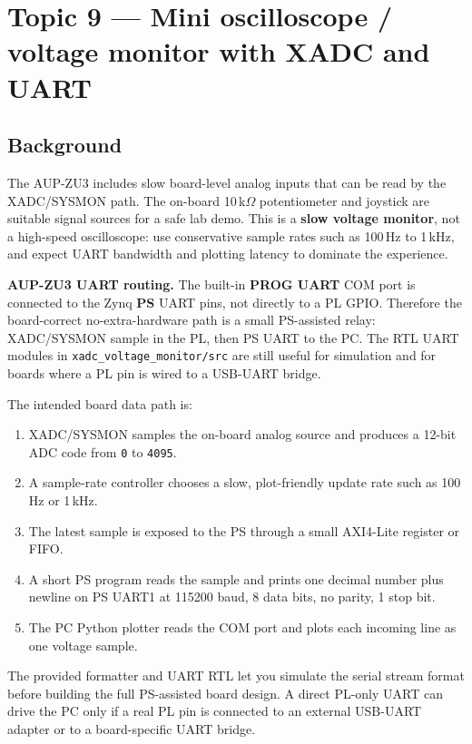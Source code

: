 
\newpage
\section{Topic 9 --- Mini oscilloscope / voltage monitor with XADC and UART}

\subsection{Background}
The AUP-ZU3 includes slow board-level analog inputs that can be read by the XADC/SYSMON path. The
on-board 10\,k$\Omega$ potentiometer and joystick are suitable signal sources for a safe lab demo. This
is a \textbf{slow voltage monitor}, not a high-speed oscilloscope: use conservative sample rates such as
100\,Hz to 1\,kHz, and expect UART bandwidth and plotting latency to dominate the experience.

\begin{notebox}
\textbf{AUP-ZU3 UART routing.} The built-in \textbf{PROG UART} COM port is connected to the Zynq
\textbf{PS} UART pins, not directly to a PL GPIO. Therefore the board-correct no-extra-hardware path is
a small PS-assisted relay: XADC/SYSMON sample in the PL, then PS UART to the PC. The RTL UART modules in
\texttt{xadc\_voltage\_monitor/src} are still useful for simulation and for boards where a PL pin is
wired to a USB-UART bridge.
\end{notebox}

The intended board data path is:
\begin{enumerate}[noitemsep]
  \item XADC/SYSMON samples the on-board analog source and produces a 12-bit ADC code
        from \texttt{0} to \texttt{4095}.
  \item A sample-rate controller chooses a slow, plot-friendly update rate such as 100\,Hz or 1\,kHz.
  \item The latest sample is exposed to the PS through a small AXI4-Lite register or FIFO.
  \item A short PS program reads the sample and prints one decimal number plus newline on PS UART1
        at 115200 baud, 8 data bits, no parity, 1 stop bit.
  \item The PC Python plotter reads the COM port and plots each incoming line as one voltage sample.
\end{enumerate}
The provided formatter and UART RTL let you simulate the serial stream format before building the full
PS-assisted board design. A direct PL-only UART can drive the PC only if a real PL pin is connected to
an external USB-UART adapter or to a board-specific UART bridge.

